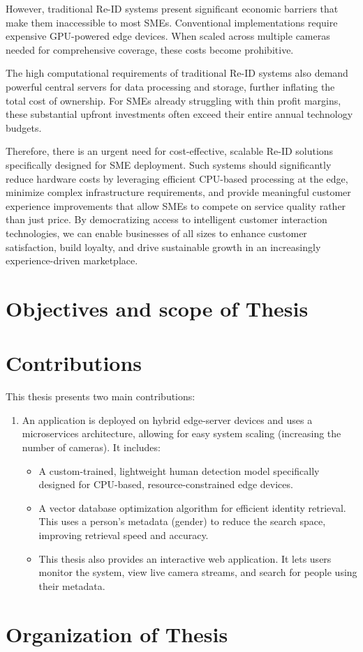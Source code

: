 \documentclass[../main.tex]{subfiles}
\begin{document}
However, traditional Re-ID systems present significant economic barriers that make them inaccessible to most SMEs. Conventional implementations require expensive GPU-powered edge devices. When scaled across multiple cameras needed for comprehensive coverage, these costs become prohibitive.

The high computational requirements of traditional Re-ID systems also demand powerful central servers for data processing and storage, further inflating the total cost of ownership. For SMEs already struggling with thin profit margins, these substantial upfront investments often exceed their entire annual technology budgets.

Therefore, there is an urgent need for cost-effective, scalable Re-ID solutions specifically designed for SME deployment. Such systems should significantly reduce hardware costs by leveraging efficient CPU-based processing at the edge, minimize complex infrastructure requirements, and provide meaningful customer experience improvements that allow SMEs to compete on service quality rather than just price. By democratizing access to intelligent customer interaction technologies, we can enable businesses of all sizes to enhance customer satisfaction, build loyalty, and drive sustainable growth in an increasingly experience-driven marketplace.

\section{Objectives and scope of Thesis} 
\label{sec:objectives}

\section{Contributions}
\label{sec:contribution}

This thesis presents two main contributions:
\begin{enumerate}
    \item An application is deployed on hybrid edge-server devices and uses a microservices architecture, allowing for easy system scaling (increasing the number of cameras). It includes:
    \begin{itemize}
        \item A custom-trained, lightweight human detection model specifically designed for CPU-based, resource-constrained edge devices.
        \item A vector database optimization algorithm for efficient identity retrieval. This uses a person's metadata (gender) to reduce the search space, improving retrieval speed and accuracy.
    \item This thesis also provides an interactive web application. It lets users monitor the system, view live camera streams, and search for people using their metadata.
\end{itemize} 
\end{enumerate}

\section{Organization of Thesis}
\label{sec:organize}
\end{document}
